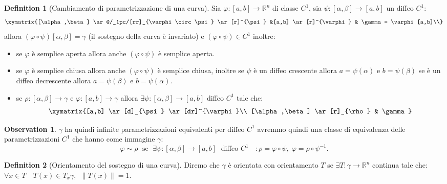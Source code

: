 \documentclass[leqno]{article}
\theoremstyle{definition}
\newtheorem{definition}{Definition}[section]
\numberwithin{equation}{section}
\newtheorem{observation}[theorem]{Observation}
\theoremstyle{remark}
\begin{document}
	\begin{definition}[Cambiamento di parametrizzazione di una curva]
		Sia $\varphi: [a,b] \to \mathbb{R}^n$ di classe $C^1$, sia $\psi : [\alpha,\beta] \to [a,b]$ un diffeo $C^1$:
		\begin{equation}
			\xymatrix{[\alpha,\beta] \ar@/_1pc/[rr]_{\varphi \circ \psi} 
				\ar[r]^{\psi}  &[a,b] \ar[r]^{\varphi} & \gamma = \varphi [a,b]\\}
		\end{equation}
		allora $(\varphi \circ \psi) [\alpha, \beta] = \gamma$ (il sostegno della curva è invariato) e $(\varphi \circ \psi) \in C^1$ inoltre:
		\begin{itemize}
			\item se $\varphi$ è semplice aperta allora anche $(\varphi \circ \psi)$ è semplice aperta. 
			\item se $\varphi$ è semplice chiusa allora anche $(\varphi \circ \psi)$ è semplice chiusa, inoltre se $\psi$ è un diffeo crescente allora $a=\psi(\alpha)$ e $b=\psi(\beta)$ se è un diffeo decrescente allora $a=\psi(\beta)$ e $b=\psi(\alpha)$.
			\item se $\rho : [\alpha,\beta]\to \gamma$ e $\varphi : [a,b] \to \gamma$ allora $\exists \psi : [\alpha, \beta] \to [a,b]$ diffeo $C^1$ tale che:\begin{equation}
				\xymatrix{[a,b] \ar[d]_{\psi} \ar[dr]^{\varphi}\\
					[\alpha,\beta] \ar[r]_{\rho} & \gamma}
			\end{equation}
		\end{itemize}
		\begin{observation}
			$\gamma$ ha quindi infinite parametrizzazioni equivalenti per diffeo $C^1$ avremmo quindi una classe di equivalenza delle parametrizzazioni $C^1$ che hanno come immagine $\gamma$:
			\begin{equation}
				\varphi \sim \rho \; \text{ se } \; \exists \psi : [\alpha,\beta] \to [a,b] \; \text{ diffeo $C^1$ } \; : \rho = \varphi \circ \psi, \; \varphi = \rho \circ \psi^{-1}.
			\end{equation}
		\end{observation}
	\end{definition}
	
	\begin{definition}[Orientamento del sostegno di una curva]
		Diremo che $\gamma$ è orientata con orientamento $T$ se $\exists T : \gamma \to \mathbb{R}^n$ continua tale che: $\forall x \in T \quad T(x)\in T_x\gamma$, $\;\lVert T(x) \rVert =1.$
	\end{definition}
	
\end{document}
